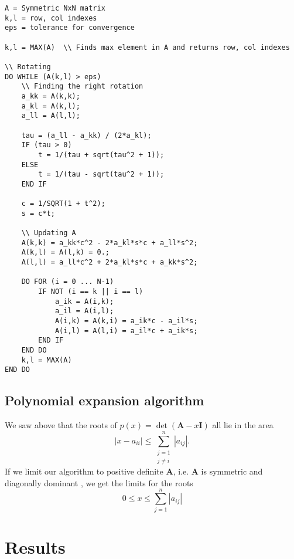 \documentclass[]{article}
\begin{document}
\begin{lstlisting}[caption={Jacobi eigenvalue algorithm},label={lst:jacobi}]
A = Symmetric NxN matrix
k,l = row, col indexes
eps = tolerance for convergence

k,l = MAX(A)  \\ Finds max element in A and returns row, col indexes

\\ Rotating
DO WHILE (A(k,l) > eps)
	\\ Finding the right rotation
	a_kk = A(k,k);
	a_kl = A(k,l);
	a_ll = A(l,l);

	tau = (a_ll - a_kk) / (2*a_kl);
	IF (tau > 0)
		t = 1/(tau + sqrt(tau^2 + 1));
	ELSE
		t = 1/(tau - sqrt(tau^2 + 1));
	END IF
	
	c = 1/SQRT(1 + t^2);
	s = c*t;
	
	\\ Updating A
	A(k,k) = a_kk*c^2 - 2*a_kl*s*c + a_ll*s^2;
	A(k,l) = A(l,k) = 0.;
	A(l,l) = a_ll*c^2 + 2*a_kl*s*c + a_kk*s^2;
	
	DO FOR (i = 0 ... N-1)
		IF NOT (i == k || i == l)
			a_ik = A(i,k);
			a_il = A(i,l);
			A(i,k) = A(k,i) = a_ik*c - a_il*s;
			A(i,l) = A(l,i) = a_il*c + a_ik*s;
		END IF
	END DO
	k,l = MAX(A)
END DO

\end{lstlisting}




\subsection{Polynomial expansion algorithm}
We saw above that the roots of $p(x) = \det(\mathbf{A} - x\mathbf{I})$ all lie in the area
\[
|x - a_{ii}| \leq \sum_{\substack{j=1 \\ j \neq i}}^{n} |a_{ij}|.
\]
If we limit our algorithm to positive definite $\mathbf{A}$, i.e. $\mathbf{A}$ is symmetric and diagonally dominant \cite{diagdom}, we get the limits for the roots
\[
0 \le x \le \sum_{j=1}^{n} |a_{ij}|
\]

\section{Results}
\end{document}
